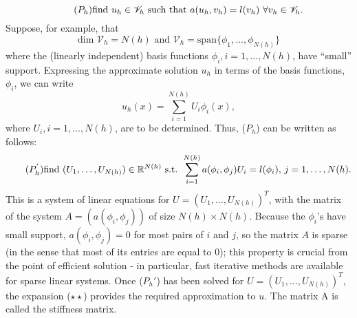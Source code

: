\begin{equation*}\tag{$P_{h}$}
	\text{find } u_h \in \mathscr{V}_h\text{ such that } a(u_h, v_h) = l(v_h) \text{ } \forall v_h \in \mathscr{V}_h .  
\end{equation*}
Suppose, for example, that
\begin{equation*}
\text{dim }\mathscr{V}_h = N(h) \text{ and } \mathscr{V}_h = \text{span} \{ \phi_1, \dots, \phi_{N(h)} \}
\end{equation*}
where the (linearly independent) basis functions $\phi_i, i=1,\dots,N(h)$, have ``small'' support. Expressing the approximate solution $u_h$ in terms of the basis functions, $\phi_i$, we can write
\begin{equation*}
\tag{$\star\star$}
u_h (x) = \sum_{i=1}^{N(h)} U_i \phi_{i}(x),
\end{equation*}
where $U_i, i = 1, \dots, N(h)$, are to be determined. Thus, ($P_h$) can be written as follows:
\begin{equation*}
\tag{$P_h^{'}$}
\text{find } (U_1, \dots, U_{N(h)}) \in \mathbb{R}^{N(h)} \text{ s.t. } \sum_{i=1}^{N(h)} a(\phi_i, \phi_j) U_i = l(\phi_i)\text{,     }j=1,\dots, N(h).
\end{equation*}
This is a system of linear equations for $U = (U_1 , \dots, U_{N(h)})^T$, with the matrix of the system $A = (a(\phi_i, \phi_j))$ of size $N(h)\times N(h)$. Because the $\phi_i\text{'s}$ have small support, $a(\phi_i, \phi_j) = 0$ for most pairs of $i$ and $j$, so the matrix $A$ is sparse (in the sense that most of its entries are equal to 0); this property is crucial from the point
of efficient solution - in particular, fast iterative methods are available for sparse linear systems. Once ($P_h{'}$) has been solved for $U = (U_1 , \dots, U_{N(h)})^T$, the expansion ($\star\star$) provides the required approximation to $u$. The matrix A is called the stiffness matrix.

